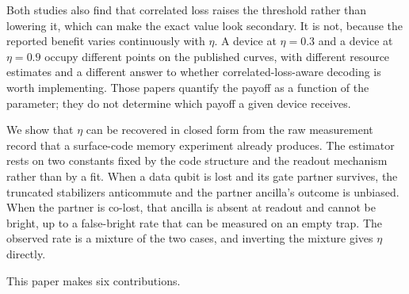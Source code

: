 \documentclass{ieeeaccess}
\begin{document}
Both studies also find that correlated loss raises the threshold rather than
lowering it, which can make the exact value look secondary. It is not, because
the reported benefit varies continuously with $\eta$. A device at $\eta=0.3$ and
a device at $\eta=0.9$ occupy different points on the published curves, with
different resource estimates and a different answer to whether
correlated-loss-aware decoding is worth implementing. Those papers quantify the
payoff as a function of the parameter; they do not determine which payoff a
given device receives.

We show that $\eta$ can be recovered in closed form from the raw measurement
record that a surface-code memory experiment already produces. The estimator
rests on two constants fixed by the code structure and the readout mechanism
rather than by a fit. When a data qubit is lost and its gate partner survives,
the truncated stabilizers anticommute and the partner ancilla's outcome is
unbiased. When the partner is co-lost, that ancilla is absent at readout and
cannot be bright, up to a false-bright rate that can be measured on an empty
trap. The observed rate is a mixture of the two cases, and inverting the mixture
gives $\eta$ directly.

This paper makes six contributions.
\end{document}
